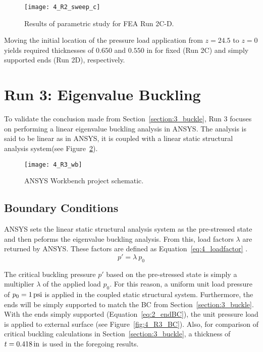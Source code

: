 \begin{figure}[H]
	\centering
	\texttt{[image: 4\_R2\_sweep\_c]}
	\caption{Results of parametric study for FEA Run 2C-D.}
	\label{fig:4_R2_sweep2}
\end{figure}

Moving the initial location of the pressure load application from $z=24.5$ to $z=0$ yields required thicknesses of $0.650$ and $0.550$ in for fixed (Run 2C) and simply supported ends (Run 2D), respectively.

\section{Run 3: Eigenvalue Buckling}
\label{section:4_R3}

To validate the conclusion made from Section~\ref{section:3_buckle}, Run 3 focuses on performing a linear eigenvalue buckling analysis in ANSYS. The analysis is said to be linear as in ANSYS, it is coupled with a linear static structural analysis system(see Figure~\ref{fig:4_R3_wb}).

\begin{figure}[H]
	\centering
	\texttt{[image: 4\_R3\_wb]}
	\caption{ANSYS Workbench project schematic.}
	\label{fig:4_R3_wb}
\end{figure}

\subsection{Boundary Conditions}

ANSYS sets the linear static structural analysis system as the pre-stressed state and then peforms the eigenvalue buckling analysis. From this, load factors $\lambda$ are returned by ANSYS. These factors are defined as Equation~\ref{eq:4_loadfactor} \cite{ANSYS}.
\begin{equation}
	\label{eq:4_loadfactor}
	p' = \lambda \ p_0
\end{equation}

The critical buckling pressure $p'$ based on the pre-stressed state is simply a multiplier $\lambda$ of the applied load $p_0$. For this reason, a uniform unit load pressure of $p_0 = 1\,\mathrm{psi}$ is applied in the coupled static structural system. Furthermore, the ends will be simply supported to match the BC from Section~\ref{section:3_buckle}.\\


With the ends simply supported (Equation~\ref{eq:2_endBC}), the unit pressure load is applied to external surface (see Figure~\ref{fig:4_R3_BC}). Also, for comparison of critical buckling calculations in Section~\ref{section:3_buckle}, a thickness of $t=0.418\,\mathrm{in}$ is used in the foregoing results. 

